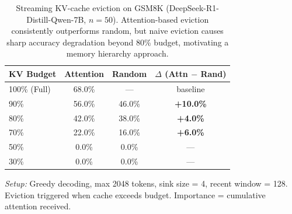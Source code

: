 \begin{table}[t]
\centering
\caption{Streaming KV-cache eviction on GSM8K (DeepSeek-R1-Distill-Qwen-7B, $n=50$).
Attention-based eviction consistently outperforms random, but naive eviction causes sharp
accuracy degradation beyond 80\% budget, motivating a memory hierarchy approach.}
\label{tab:streaming_eviction}
\vskip 0.1in
\begin{tabular}{lccc}
\toprule
\textbf{KV Budget} & \textbf{Attention} & \textbf{Random} & \textbf{$\Delta$ (Attn $-$ Rand)} \\
\midrule
100\% (Full) & 68.0\% & --- & baseline \\
90\%         & 56.0\% & 46.0\% & \textbf{+10.0\%} \\
80\%         & 42.0\% & 38.0\% & \textbf{+4.0\%} \\
70\%         & 22.0\% & 16.0\% & \textbf{+6.0\%} \\
50\%         & 0.0\%  & 0.0\%  & --- \\
30\%         & 0.0\%  & 0.0\%  & --- \\
\bottomrule
\end{tabular}
\vskip 0.05in
\begin{minipage}{0.9\linewidth}
\small
\textit{Setup:} Greedy decoding, max 2048 tokens, sink size = 4, recent window = 128.
Eviction triggered when cache exceeds budget. Importance = cumulative attention received.
\end{minipage}
\end{table}